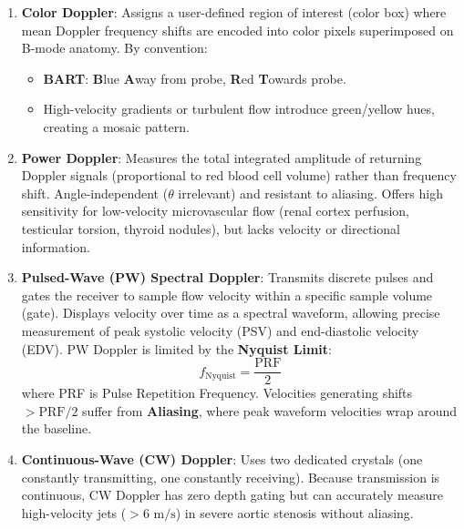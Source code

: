 \documentclass[11pt,a4paper]{article}
\begin{document}
\begin{enumerate}[leftmargin=*]
    \item \textbf{Color Doppler}: Assigns a user-defined region of interest (color box) where mean Doppler frequency shifts are encoded into color pixels superimposed on B-mode anatomy. By convention:
    \begin{itemize}
        \item \textbf{BART}: \textbf{B}lue \textbf{A}way from probe, \textbf{R}ed \textbf{T}owards probe.
        \item High-velocity gradients or turbulent flow introduce green/yellow hues, creating a mosaic pattern.
    \end{itemize}
    \item \textbf{Power Doppler}: Measures the total integrated amplitude of returning Doppler signals (proportional to red blood cell volume) rather than frequency shift. Angle-independent ($\theta$ irrelevant) and resistant to aliasing. Offers high sensitivity for low-velocity microvascular flow (renal cortex perfusion, testicular torsion, thyroid nodules), but lacks velocity or directional information.
    \item \textbf{Pulsed-Wave (PW) Spectral Doppler}: Transmits discrete pulses and gates the receiver to sample flow velocity within a specific sample volume (gate). Displays velocity over time as a spectral waveform, allowing precise measurement of peak systolic velocity (PSV) and end-diastolic velocity (EDV). PW Doppler is limited by the \textbf{Nyquist Limit}:
    \begin{equation}
        f_{\text{Nyquist}} = \frac{\text{PRF}}{2}
    \end{equation}
    where PRF is Pulse Repetition Frequency. Velocities generating shifts $> \text{PRF}/2$ suffer from \textbf{Aliasing}, where peak waveform velocities wrap around the baseline.
    \item \textbf{Continuous-Wave (CW) Doppler}: Uses two dedicated crystals (one constantly transmitting, one constantly receiving). Because transmission is continuous, CW Doppler has zero depth gating but can accurately measure high-velocity jets ($>6\text{ m/s}$) in severe aortic stenosis without aliasing.
\end{enumerate}
\end{document}
